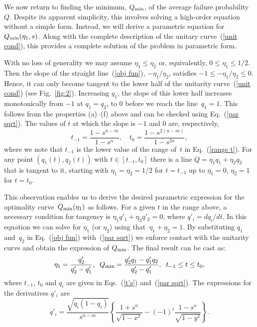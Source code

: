 \documentclass[aps,prl,twocolumn,showpacs]{revtex4}
\begin{document}
We now return to finding the minimum, $Q_{\rm min}$, of the average failure probability $Q$. Despite its apparent simplicity, this involves solving a high-order equation without a simple form. Instead, we will derive a parametric equation for $Q_{\rm min}(\eta_1,s)$. Along with the complete description of the unitary curve~(\ref{unit cond}), this provides a complete solution of the problem in parametric form.

With no loss of generality we may assume $\eta_1\le\eta_2$ or, equivalently,  $0\le\eta_1\le 1/2$. Then the slope of the straight line~(\ref{obj fun}), $-\eta_{1}/ \eta_{2}$, satisfies $-1\leq -\eta_{1}/\eta_{2} \leq0$. Hence, it can only become tangent to the lower half of the unitarity curve~(\ref{unit cond}) (see Fig.~\ref{fig:2}). %
Increasing $q_{1}$, the slope of this lower half increases monotonically from $-1$ at $q_1=q_2$, to $0$ before we reach the line~$q_1=1$. This follows from the properties (a)--(f) above and can be checked using  Eq.~(\ref{par sqrt}). The values of $t$ at which the slope is $-1$ and $0$ are, respectively,
%
\begin{equation}
t_{-1}=\frac{1-s^{n-m}}{1-s^n},\quad
t_0=\frac{1-s^{2(n-m)}}{1-s^{2n}},
\label{t's}
\end{equation}
%
where we note that $t_{-1}$ is the lower value of the range of~$t$ in Eq.~(\ref{range t}). For any point $(q_1(t),q_2(t))$ with $t\in[t_{-1},t_0]$ there is a line $Q=\eta_1 q_1+\eta_2 q_2$ that is tangent to it, starting with $\eta_1=\eta_2=1/2$ for $t=t_{-1}$ up to $\eta_1=0$, $\eta_2=1$ for $t=t_0$. 

This observation enables us to derive the desired parametric expression for the optimality curve~$Q_{\rm min}(\eta_1)$ as follows. For a given $t$ in the range above, a necessary condition for tangency is \mbox{$\eta_1 q'_1+\eta_2 q'_2=0$}, where $q'_i=d q_i/d t$. In this equation we can solve for $\eta_1$ (or $\eta_2$) using that~$\eta_1+\eta_2=1$. By substituting $q_1$ and~$q_2$ in Eq.~(\ref{obj fun}) with~(\ref{par sqrt}) we enforce contact with the unitarity curve and obtain the expression of $Q_{\rm min}$. The final result can be cast as:
%
\begin{equation}
\eta_1=\frac{q'_2}{q'_2-q'_1},\;\; Q_{\rm min}=\frac{q'_2 q_1-q'_1 q_2}{q'_2-q'_1},\;\; t_{-1}\le t\le t_0,
\label{main}
\end{equation}
%
where $t_{-1}$, $t_0$ and $q_i$ are given in Eqs.~(\ref{t's}) and~(\ref{par sqrt}). The expressions for the derivatives $q'_i$ are %
%
\begin{equation}
q'_i=\frac{\sqrt{q_i(1-q_i)}}{s^{n-m}}\left\{\frac{1+s^n}{\sqrt{1-x^2}}-(-1)^i\frac{1-s^n}{\sqrt{1-y^2}}\right\}.
\end{equation}
%
\end{document}
